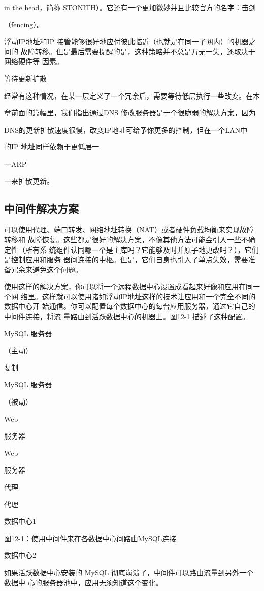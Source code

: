 in the head，简称 STONITH）。它还有一个更加微妙并且比较官方的名字：击剑

（fencing）。

浮动IP地址和IP 接管能够很好地应付彼此临近（也就是在同一子网内）的机器之间的
故障转移。但是最后需要提醒的是，这种策略并不总是万无一失，还取决于网络硬件等
因素。

等待更新扩散

经常有这种情况，在某一层定义了一个冗余后，需要等待低层执行一些改变。在本

章前面的篇幅里，我们指出通过DNS 修改服务器是一个很脆弱的解决方案，因为

DNS的更新扩散速度很慢，改变IP地址可给予你更多的控制，但在一个LAN中

的IP 地址同样依赖于更低层一

一ARP-

一来扩散更新。

\subsection{中间件解决方案}
可以使用代理、端口转发、网络地址转换（NAT）或者硬件负载均衡来实现故障转移和
故障恢复。这些都是很好的解决方案，不像其他方法可能会引入一些不确定性（所有系
统组件认同哪一个是主库吗？它能够及时并原子地更改吗？），它们是控制应用和服务
器间连接的中枢。但是，它们自身也引入了单点失效，需要准备冗余来避免这个问题。

使用这样的解决方案，你可以将一个远程数据中心设置成看起来好像和应用在同一个网
络里。这样就可以使用诸如浮动IP地址这样的技术让应用和一个完全不同的数据中心开
始通信。你可以配置每个数据中心的每台应用服务器，通过它自己的中间件连接，将流
量路由到活跃数据中心的机器上。图12-1 描述了这种配置。

MySQL 服务器

（主动）

复制

MySQL 服务器

（被动）

Web

服务器

Web

服务器

代理

代理

数据中心1

图12-1：使用中间件来在各数据中心间路由MySQL连接

数据中心2

如果活跃数据中心安装的 MySQL 彻底崩溃了，中间件可以路由流量到另外一个数据中
心的服务器池中，应用无须知道这个变化。

